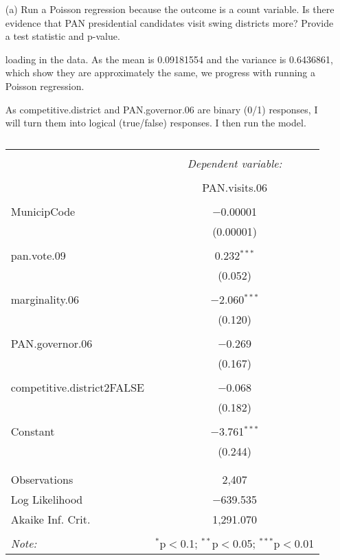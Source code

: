 \documentclass[12pt,letterpaper]{article}
\begin{document}
\begin{enumerate}
	\item [(a)]
	Run a Poisson regression because the outcome is a count variable. Is there evidence that PAN presidential candidates visit swing districts more? Provide a test statistic and p-value.
	
 
loading in the data. As the mean is 0.09181554 and the variance is 0.6436861, which show they are approximately the same, we progress with running a Poisson regression. 



As competitive.district and PAN.governor.06 are binary (0/1) responses, I will turn them into logical (true/false) responses. I then run the model. 

\begin{table}[!htbp] \centering 
	\caption{} 
	\label{} 
	\begin{tabular}{@{\extracolsep{5pt}}lc} 
		\\[-1.8ex]\hline 
		\hline \\[-1.8ex] 
		& \multicolumn{1}{c}{\textit{Dependent variable:}} \\ 
		\cline{2-2} 
		\\[-1.8ex] & PAN.visits.06 \\ 
		\hline \\[-1.8ex] 
		MunicipCode & $-$0.00001 \\ 
		& (0.00001) \\ 
		& \\ 
		pan.vote.09 & 0.232$^{***}$ \\ 
		& (0.052) \\ 
		& \\ 
		marginality.06 & $-$2.060$^{***}$ \\ 
		& (0.120) \\ 
		& \\ 
		PAN.governor.06 & $-$0.269 \\ 
		& (0.167) \\ 
		& \\ 
		competitive.district2FALSE & $-$0.068 \\ 
		& (0.182) \\ 
		& \\ 
		Constant & $-$3.761$^{***}$ \\ 
		& (0.244) \\ 
		& \\ 
		\hline \\[-1.8ex] 
		Observations & 2,407 \\ 
		Log Likelihood & $-$639.535 \\ 
		Akaike Inf. Crit. & 1,291.070 \\ 
		\hline 
		\hline \\[-1.8ex] 
		\textit{Note:}  & \multicolumn{1}{r}{$^{*}$p$<$0.1; $^{**}$p$<$0.05; $^{***}$p$<$0.01} \\ 
	\end{tabular} 
\end{table} 


\end{enumerate}
\end{document}
